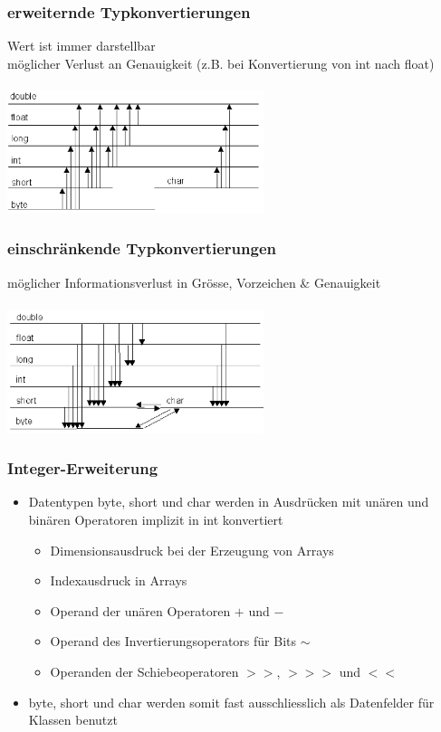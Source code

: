 \documentclass[a4paper,10pt]{article}
\begin{document}
\subsubsection{erweiternde Typkonvertierungen}
		Wert ist immer darstellbar \\
		m\"oglicher Verlust an Genauigkeit (z.B. bei Konvertierung von int nach float) \\ \\
		\includegraphics[width=75mm]{erweiternde_typumwandlung.png} \\
		
\subsubsection{einschr\"ankende Typkonvertierungen}
		m\"oglicher Informationsverlust in Gr\"osse, Vorzeichen \& Genauigkeit \\ \\
\includegraphics[width=75mm]{einschraenkende_typumwandlung.png}

\subsubsection{Integer-Erweiterung}
\begin{itemize}
	\item Datentypen byte, short und char werden in Ausdr\"ucken mit un\"aren und bin\"aren Operatoren implizit in int konvertiert
		\begin{itemize}
			\item Dimensionsausdruck bei der Erzeugung von Arrays
			\item Indexausdruck in Arrays
			\item Operand der un\"aren Operatoren $+$ und $ - $
			\item Operand des Invertierungsoperators f\"ur Bits $\sim$
			\item Operanden der Schiebeoperatoren $>>$, $>>>$ und $<<$
		\end{itemize}
	\item byte, short und char werden somit fast ausschliesslich als Datenfelder f\"ur Klassen benutzt
\end{itemize}
\end{document}
